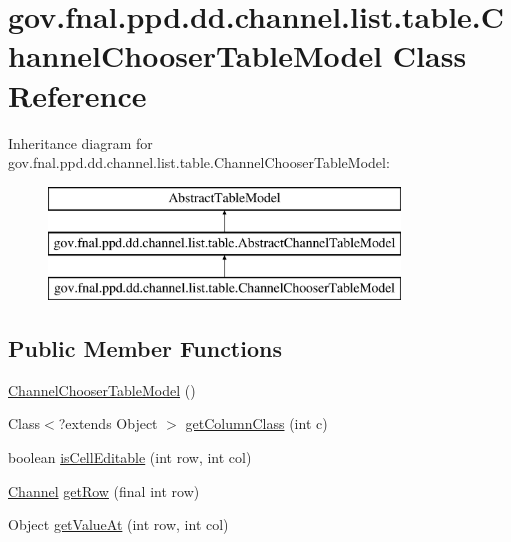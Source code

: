 \hypertarget{classgov_1_1fnal_1_1ppd_1_1dd_1_1channel_1_1list_1_1table_1_1ChannelChooserTableModel}{\section{gov.\-fnal.\-ppd.\-dd.\-channel.\-list.\-table.\-Channel\-Chooser\-Table\-Model Class Reference}
\label{classgov_1_1fnal_1_1ppd_1_1dd_1_1channel_1_1list_1_1table_1_1ChannelChooserTableModel}
}
Inheritance diagram for gov.\-fnal.\-ppd.\-dd.\-channel.\-list.\-table.\-Channel\-Chooser\-Table\-Model\-:\begin{figure}[H]
\begin{center}
\leavevmode
\includegraphics[height=3.000000cm]{classgov_1_1fnal_1_1ppd_1_1dd_1_1channel_1_1list_1_1table_1_1ChannelChooserTableModel}
\end{center}
\end{figure}
\subsection*{Public Member Functions}
\begin{DoxyCompactItemize}
\item 
\hyperlink{classgov_1_1fnal_1_1ppd_1_1dd_1_1channel_1_1list_1_1table_1_1ChannelChooserTableModel_a8f0aa1b175927a29c20d4ea1f442f3a9}{Channel\-Chooser\-Table\-Model} ()
\item 
Class$<$?extends Object $>$ \hyperlink{classgov_1_1fnal_1_1ppd_1_1dd_1_1channel_1_1list_1_1table_1_1ChannelChooserTableModel_aee82669d923468d8771f356e6c79be92}{get\-Column\-Class} (int c)
\item 
boolean \hyperlink{classgov_1_1fnal_1_1ppd_1_1dd_1_1channel_1_1list_1_1table_1_1ChannelChooserTableModel_ab91b1da702ee05933622a6aad3439424}{is\-Cell\-Editable} (int row, int col)
\item 
\hyperlink{interfacegov_1_1fnal_1_1ppd_1_1dd_1_1signage_1_1Channel}{Channel} \hyperlink{classgov_1_1fnal_1_1ppd_1_1dd_1_1channel_1_1list_1_1table_1_1ChannelChooserTableModel_a60f6f27e6f106dcbbdc21bece4b2f6bf}{get\-Row} (final int row)
\item 
Object \hyperlink{classgov_1_1fnal_1_1ppd_1_1dd_1_1channel_1_1list_1_1table_1_1ChannelChooserTableModel_adcb62fe264622dd9718a3587622a064f}{get\-Value\-At} (int row, int col)
\end{DoxyCompactItemize}
